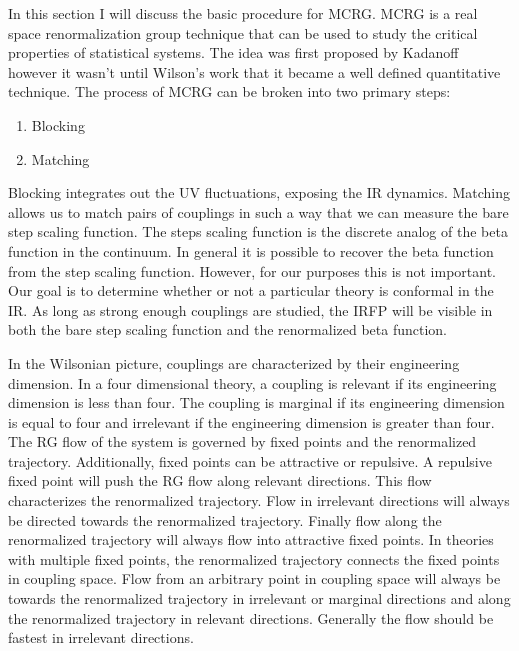 
In this section I will discuss the basic procedure for MCRG.
MCRG is a real space renormalization group technique that can be used to study the critical properties of statistical systems.
The idea was first proposed by Kadanoff however it wasn't until Wilson's work that it became a well defined quantitative technique.
The process of MCRG can be broken into two primary steps:
\begin{enumerate}
  \item Blocking
  \item Matching
\end{enumerate}
Blocking integrates out the UV fluctuations, exposing the IR dynamics.
Matching allows us to match pairs of couplings in such a way that we can measure the bare step scaling function.
The steps scaling function is the discrete analog of the beta function in the continuum.
In general it is possible to recover the beta function from the step scaling function.
However, for our purposes this is not important.
Our goal is to determine whether or not a particular theory is conformal in the IR.
As long as strong enough couplings are studied, the IRFP will be visible in both the bare step scaling function and the renormalized beta function.

In the Wilsonian picture, couplings are characterized by their engineering dimension.
In a four dimensional theory, a coupling is relevant if its engineering dimension is less than four.
The coupling is marginal if its engineering dimension is equal to four and irrelevant if the engineering dimension is greater than four.
The RG flow of the system is governed by fixed points and the renormalized trajectory.
Additionally, fixed points can be attractive or repulsive.
A repulsive fixed point will push the RG flow along relevant directions.
This flow characterizes the renormalized trajectory.
Flow in irrelevant directions will always be directed towards the renormalized trajectory.
Finally flow along the renormalized trajectory will always flow into attractive fixed points.
In theories with multiple fixed points, the renormalized trajectory connects the fixed points in coupling space.
Flow from an arbitrary point in coupling space will always be towards the renormalized trajectory in irrelevant or marginal directions and along the renormalized trajectory in relevant directions.
Generally the flow should be fastest in irrelevant directions.

